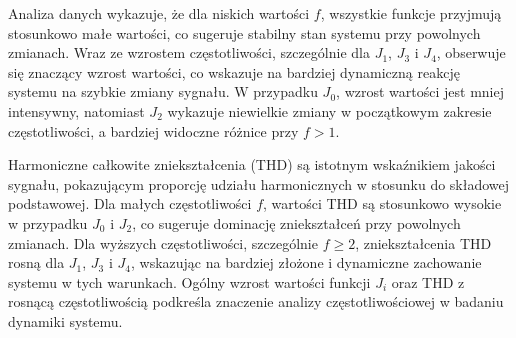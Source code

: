 \documentclass[journal,twoside,web]{ieeecolor}
\begin{document}
Analiza danych wykazuje, że dla niskich wartości \(f\), wszystkie funkcje przyjmują stosunkowo małe wartości, co sugeruje stabilny stan systemu przy powolnych zmianach. Wraz ze wzrostem częstotliwości, szczególnie dla \(J_1\), \(J_3\) i \(J_4\), obserwuje się znaczący wzrost wartości, co wskazuje na bardziej dynamiczną reakcję systemu na szybkie zmiany sygnału. W przypadku \(J_0\), wzrost wartości jest mniej intensywny, natomiast \(J_2\) wykazuje niewielkie zmiany w początkowym zakresie częstotliwości, a bardziej widoczne różnice przy \(f > 1\).

Harmoniczne całkowite zniekształcenia (THD) są istotnym wskaźnikiem jakości sygnału, pokazującym proporcję udziału harmonicznych w stosunku do składowej podstawowej. Dla małych częstotliwości \(f\), wartości THD są stosunkowo wysokie w przypadku \(J_0\) i \(J_2\), co sugeruje dominację zniekształceń przy powolnych zmianach. Dla wyższych częstotliwości, szczególnie \(f \geq 2\), zniekształcenia THD rosną dla \(J_1\), \(J_3\) i \(J_4\), wskazując na bardziej złożone i dynamiczne zachowanie systemu w tych warunkach. Ogólny wzrost wartości funkcji \(J_i\) oraz THD z rosnącą częstotliwością podkreśla znaczenie analizy częstotliwościowej w badaniu dynamiki systemu.
\end{document}
